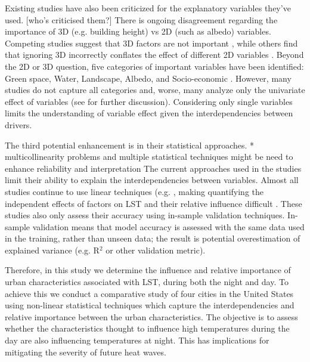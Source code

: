 \documentclass[final,3p,times,twocolumn,sort&compress]{elsarticle}
\begin{document}
Existing studies have also been criticized for the explanatory variables they've used. [who's criticised them?]
There is ongoing disagreement regarding the importance of 3D (e.g. building height) vs 2D (such as albedo) variables.  
Competing studies suggest that 3D factors are not important \cite{Berger2017-lx}, while others find that ignoring 3D incorrectly conflates the effect of different 2D variables \cite{Chun2017-mm}.
Beyond the 2D or 3D question, five categories of important variables have been identified: Green space, Water, Landscape, Albedo, and Socio-economic \cite{Peng2018-cp}. 
However, many studies do not capture all categories and, worse, many analyze only the univariate effect of variables \cite{Zhao2017-cc, Merbitz2012-xz, Unger2004-ry} (see \cite{Peng2018-cp, Chun2017-mm} for further discussion). 
Considering only single variables limits the understanding of variable effect given the interdependencies between drivers.

The third potential enhancement is in their statistical approaches.
* multicollinearity problems and multiple statistical techniques might be need to enhance reliability and interpretation \cite{Zhou2014-wc}
The current approaches used in the studies limit their ability to explain the interdependencies between variables. 
Almost all studies continue to use linear techniques (e.g. \cite{Li2017-yl, Peng2012-iy, Wicki2017-fv,Zhou2014-wc,Peng2018-cp,Echevarria_Icaza2016-fr,Chun2017-mm,Chun2018-so,Wang2019-tree,Wang2019-water}, making quantifying the independent effects of factors on LST and their relative influence difficult \cite{Peng2018-cp, Zhou2014-wc}.
These studies also only assess their accuracy using in-sample validation techniques.
In-sample validation means that model accuracy is assessed with the same data used in the training, rather than unseen data; the result is potential overestimation of explained variance (e.g. R$^2$ or other validation metric).

Therefore, in this study we determine the influence and relative importance of urban characteristics associated with LST, during both the night and day. 
To achieve this we conduct a comparative study of four cities in the United States using non-linear statistical techniques which capture the interdependencies and relative importance between the urban characteristics.
The objective is to assess whether the characteristics thought to influence high temperatures during the day are also influencing temperatures at night.
This has implications for mitigating the severity of future heat waves.
\end{document}

